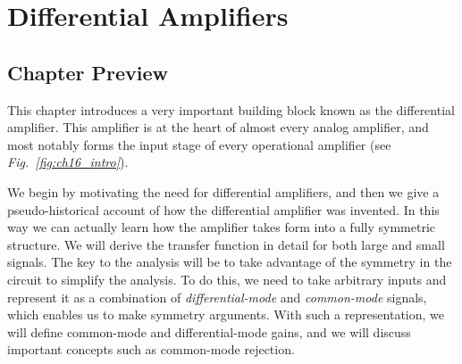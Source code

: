 \chapter{Differential Amplifiers}
\label{ch:ch16_diff_amp}
\graphicspath{{./figures/figs_ch16_diffamp/}}
\section{Chapter Preview}
This chapter introduces a very important building block known as the differential amplifier.  This amplifier is at the heart of almost every analog amplifier, and most notably forms the input stage of every operational amplifier (see \emph{Fig.~\ref{fig:ch16_intro}}).

We begin by motivating the need for differential amplifiers, and then we give a pseudo-historical account of how the differential amplifier was invented.  In this way we can actually learn how the amplifier takes form into a fully symmetric structure.  We will derive the transfer function in detail for both large and small signals.  The key to the analysis will be to take advantage of the symmetry in the circuit to simplify the analysis.  To do this, we need to take arbitrary inputs and represent it as a combination of \emph{differential-mode} and \emph{common-mode} signals, which enables us to make symmetry arguments.  With such a representation, we will define common-mode and differential-mode gains, and we will discuss important concepts such as common-mode rejection.

